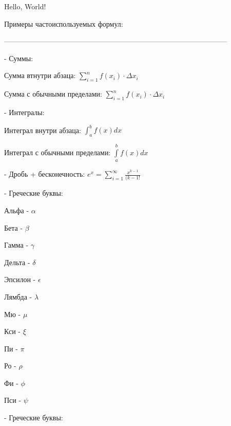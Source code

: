 \documentclass[12pt]{article}
\begin{document}
Hello, World!


Примеры частоиспользуемых формул:

---------------------------------------------------------------------------------------------

- Суммы:
\begin{itemize}
{
\setlength{\leftskip}{5em}
\item Сумма втнутри абзаца: $\sum_{i=1}^n f(x_i)\cdot\Delta x_i$
\item Сумма с обычными пределами: $\sum\limits_{i=1}^n f(x_i)\!\cdot\!\Delta x_i$

}
\end{itemize}


- Интегралы:
\begin{itemize}
{
\setlength{\leftskip}{5em}
\item Интеграл внутри абзаца: $\int_a^b f(x)dx$
\item Интеграл с обычными пределами: $\int\limits_a^b f(x)dx$

}
\end{itemize}


- Дробь + бесконечность: $e^x = \sum\limits_{i=1}^\infty \frac{x^{k-1}}{(k-1!}$


- Греческие буквы:
\begin{itemize}
{
\setlength{\leftskip}{5em}
\item Альфа - $\alpha$
\item Бета - $\beta$
\item Гамма - $\gamma$
\item Дельта - $\delta$
\item Эпсилон - $\epsilon$
\item Лямбда - $\lambda$
\item Мю - $\mu$
\item Кси - $\xi$
\item Пи - $\pi$
\item Ро - $\rho$
\item Фи - $\phi$
\item Пси - $\psi$

}

- Греческие буквы:
\end{itemize}
\end{document}
